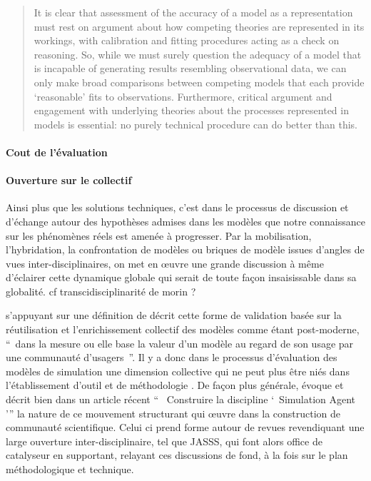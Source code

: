 \begin{quotation} It is clear that assessment of the accuracy of a model as a representation must rest on argument about how competing theories are represented in its workings, with calibration and fitting procedures acting as a check on reasoning. So, while we must surely question the adequacy of a model that is incapable of generating results resembling observational data, we can only make broad comparisons between competing models that each provide ‘reasonable’ fits to observations. Furthermore, critical argument and engagement with underlying theories about the processes represented in models is essential: no purely technical procedure can do better than this.  \\  \end{quotation}



\paragraph{Cout de l'évaluation}


\paragraph{Ouverture sur le collectif}

Ainsi plus que les solutions techniques, c'est dans le processus de discussion et d'échange autour des hypothèses admises dans les modèles que notre connaissance sur les phénomènes réels est amenée à progresser. Par la mobilisation, l'hybridation, la confrontation de modèles ou briques de modèle issues d'angles de vues inter-disciplinaires,  on met en œuvre une grande discussion à même d'éclairer cette dynamique globale qui serait de toute façon insaisissable dans sa globalité. {cf transcidisciplinarité de morin ?}

\autocite{Rouchier2013} s'appuyant sur une définition de  décrit cette forme de validation basée sur la réutilisation et l'enrichissement collectif des modèles comme étant post-moderne, \enquote{ dans la mesure ou elle base la valeur d'un modèle au regard de son usage par une communauté d'usagers }. Il y a donc dans le processus d'évaluation des modèles de simulation une dimension collective qui ne peut plus être niés dans l'établissement d'outil et de méthodologie . De façon plus générale, \autocite{Rouchier2013} évoque et décrit bien dans un article récent \enquote{  Construire la discipline \enquote{ Simulation Agent }} la nature de ce mouvement structurant qui œuvre dans la construction de communauté scientifique. Celui ci prend forme autour de revues revendiquant une large ouverture inter-disciplinaire, tel que JASSS, qui font alors office de catalyseur en supportant, relayant ces discussions de fond, à la fois sur le plan méthodologique et technique.

